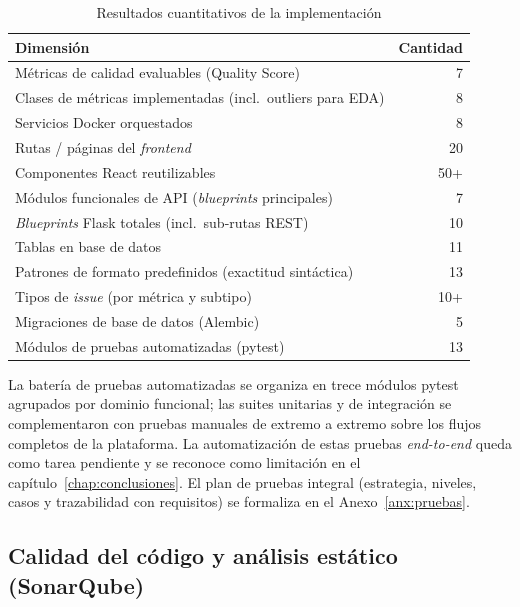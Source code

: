 \begin{table}[htbp]
  \centering
  \caption{Resultados cuantitativos de la implementación}
  \label{tab:resultados-cuantitativos}
  \begin{tabularx}{\textwidth}{X r}
    \toprule
    \textbf{Dimensión} & \textbf{Cantidad} \\
    \midrule
    Métricas de calidad evaluables (Quality Score) & 7     \\
    Clases de métricas implementadas (incl.\ outliers para \ac{EDA}) & 8 \\
    Servicios Docker orquestados                    & 8     \\
    Rutas / páginas del \emph{frontend}             & 20    \\
    Componentes React reutilizables                 & 50+   \\
    Módulos funcionales de \ac{API} (\emph{blueprints} principales) & 7 \\
    \emph{Blueprints} Flask totales (incl.\ sub-rutas \ac{REST})        & 10 \\
    Tablas en base de datos                         & 11    \\
    Patrones de formato predefinidos (exactitud sintáctica) & 13 \\
    Tipos de \emph{issue} (por métrica y subtipo)   & 10+   \\
    Migraciones de base de datos (Alembic)          & 5     \\
    Módulos de pruebas automatizadas (pytest)       & 13    \\
    \bottomrule
  \end{tabularx}
\end{table}

La batería de pruebas automatizadas se organiza en trece módulos pytest
agrupados por dominio funcional; las suites unitarias y de integración
se complementaron con pruebas manuales de extremo a extremo sobre los
flujos completos de la plataforma.  La automatización de estas pruebas
\emph{end-to-end} queda como tarea pendiente y se reconoce como
limitación en el capítulo~\ref{chap:conclusiones}.  El plan de pruebas
integral (estrategia, niveles, casos y trazabilidad con requisitos) se
formaliza en el Anexo~\ref{anx:pruebas}.

\subsection{Calidad del código y análisis estático (SonarQube)}
\label{sec:calidad-sonarqube-resumen}

